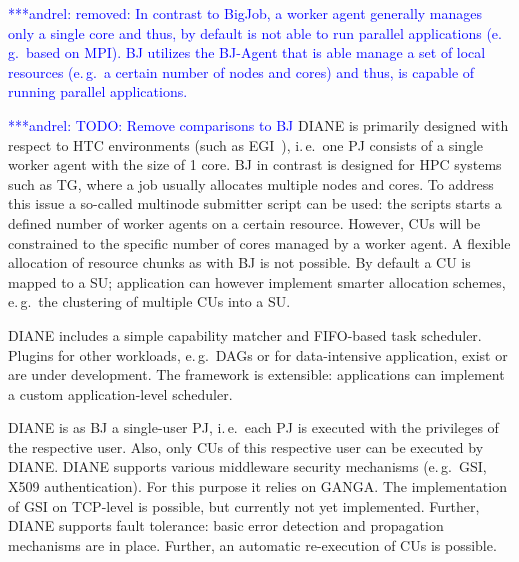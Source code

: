 \documentclass[conference,final]{IEEEtran}
\newcommand{\alnote}[1]{ {\textcolor{blue} { ***andrel: #1 }}}
\newcommand{\alnote}[1]{}
\newcommand{\cu}{CU\xspace}
\newcommand{\cus}{CUs\xspace}
\newcommand{\upp}{\vspace*{-0.5em}}
\begin{document}
\alnote{removed: In contrast to BigJob, a worker agent generally manages only a single
core and thus, by default is not able to run parallel applications (e.\,g.\
based on MPI). BJ utilizes the BJ-Agent that is able manage a set of local
resources (e.\,g.\ a certain number of nodes and cores) and thus, is capable
of running parallel applications. }


\alnote{TODO: Remove comparisons to BJ}
DIANE is primarily designed with respect to HTC environments (such as
EGI~\cite{egi}), i.\,e.\ one PJ consists of a single worker agent with the
size of 1 core. BJ in contrast is designed for HPC systems such as TG,
where a job usually allocates multiple nodes and cores. To address this issue
a so-called multinode submitter script can be used: the scripts starts a
defined number of worker agents on a certain resource. However, \cus will be
constrained to the specific number of cores managed by a worker agent. A
flexible allocation of resource chunks as with BJ is not possible. By
default a \cu  is mapped to a SU; application can however implement smarter
allocation schemes, e.\,g.\ the clustering of multiple \cus into a SU.

DIANE includes a simple capability matcher and FIFO-based task scheduler.
Plugins for other workloads, e.\,g.\ DAGs or for data-intensive
application, exist or are under development. The framework is extensible:
applications can implement a custom application-level scheduler.


DIANE is as BJ a single-user PJ, i.\,e.\ each PJ is executed with the privileges
of the respective user. Also, only \cus of this respective user can be executed
by DIANE. DIANE supports various middleware security mechanisms (e.\,g.\ GSI,
X509 authentication). For this purpose it relies on GANGA. The implementation of
GSI on TCP-level is possible, but currently not yet implemented. Further, DIANE
supports fault tolerance: basic error detection and propagation mechanisms are
in place. Further, an automatic re-execution of \cus is possible.





% 
\upp
\end{document}

